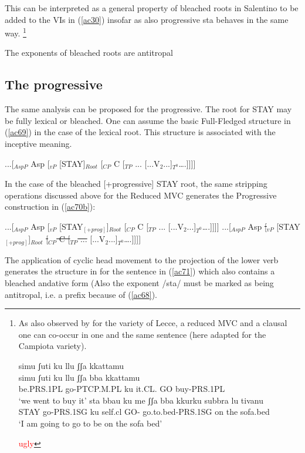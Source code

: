 \documentclass[output=paper]{langscibook}
\begin{document}
This can be interpreted as a general property of bleached roots in Salentino to be added to the VIs in (\ref{ac30}) insofar as also progressive sta behaves in the same way. \footnote{As also observed by \cite{ledgeway2016a} for the variety of Lecce, a reduced MVC and a clausal one can co-occur in one and the same sentence (here adapted for the Campiota variety).

\ea \label{fn33ex}
    \ea \label{fn33exa}\gll simu      ʃuti        ku   llu     ʃʃa {} kkattamu\\
  simu      ʃuti       ku   llu    ʃʃa  bba kkattamu\\
be.PRS.1PL go-PTCP.M.PL  ku   it.CL.    GO  buy-PRS.1PL\\
\glt  ‘we went to buy it’
    \ex \label{fn33exb}\gll sta   bbau     ku  me   ʃʃa bba kkurku      subbra lu tivanu\\
    STAY go-PRS.1SG ku  self.cl  GO- go.to.bed-PRS.1SG on  the sofa.bed\\
    \glt ‘I am going to go to be on the sofa bed’
    \z
\z

\textcolor{red}{ugly}

}

\ea\label{ac68}
The exponents of bleached roots are antitropal
\z

\subsection{The progressive}

The same analysis can be proposed for the progressive.  The root for STAY may be fully lexical or bleached. One can assume the basic Full-Fledged structure in (\ref{ac69}) in the case of the lexical root.  This structure is associated with the inceptive meaning.

\ea \label{ac69}...[$_{AspP}$ Asp [$_{vP}$ [STAY]$_{Root}$ [$_{CP}$ C [$_{TP}$ ... [...V$_2$...]$_{T^0}$….]]]]
\z

In the case of the bleached [+progressive] STAY root, the same stripping operations discussed above for the Reduced MVC generates the Progressive construction in (\ref{ac70b}):

\ea \label{ac70}
    \ea \label{ac70a}...[$_{AspP}$ Asp [$_{vP}$ [STAY$_{[+prog]}$]$_{Root}$ [$_{CP}$ C [$_{TP}$ ... [...V$_2$...]$_{T^0}$….]]]]
    \ex \label{ac70b}...[$_{AspP}$ Asp \sout{[$_{vP}$} [STAY$_{[+prog]}$]$_{Root}$ \sout{[$_{CP}$ C [$_{TP}$ ...} [...V$_2$...]$_{T^0}$….]]]]
    \z
\z

The application of cyclic head movement to the projection of the lower verb generates the structure in  for the sentence in (\ref{ac71}) which also contains a bleached andative form (Also the exponent /sta/ must be marked as being antitropal, i.e. a prefix because of (\ref{ac68}). 
\end{document}
